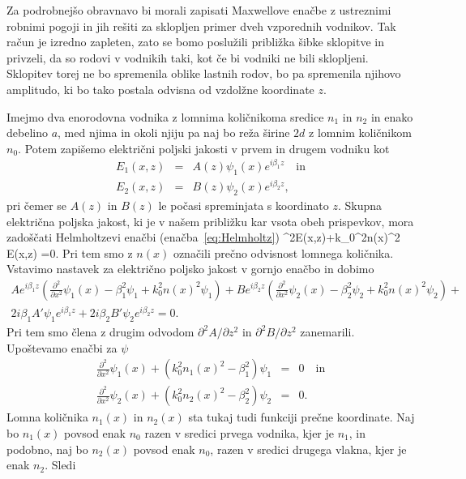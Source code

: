 Za podrobnejšo obravnavo bi morali zapisati Maxwellove enačbe z ustreznimi robnimi pogoji 
in jih rešiti za sklopljen primer dveh vzporednih vodnikov. Tak račun je izredno zapleten, 
zato se bomo poslužili približka šibke sklopitve in privzeli, da so rodovi v vodnikih taki, 
kot če bi vodniki ne bili sklopljeni.
Sklopitev torej ne bo spremenila oblike lastnih rodov, bo pa spremenila njihovo amplitudo, ki 
bo tako postala odvisna od vzdolžne koordinate $z$.

Imejmo dva enorodovna vodnika z lomnima količnikoma sredice $n_1$ in $n_2$ in enako 
debelino $a$, med njima in okoli njiju pa naj bo reža širine $2d$ z lomnim količnikom $n_0$. 
Potem zapišemo električni poljski jakosti v prvem in drugem vodniku kot
\begin{eqnarray}
E_1(x,z) &=& A(z) \psi_1(x) e^{i \beta_1 z} \quad \mathrm{in}\\
E_2(x,z) &=& B(z) \psi_2(x) e^{i \beta_2 z},
\label{eq:10_ampl}
\end{eqnarray}
pri čemer se $A(z)$ in $B(z)$ le počasi spreminjata s koordinato $z$. Skupna električna poljska
jakost, ki je v našem približku kar vsota obeh prispevkov, mora zadoščati Helmholtzevi enačbi
(enačba~\ref{eq:Helmholtz})
\beq
\nabla^{2}E(x,z)+k_0^{2}n(x)^2 E(x,z) =0.
\eeq
Pri tem smo z $n(x)$ označili prečno odvisnost lomnega količnika.
Vstavimo nastavek za električno poljsko jakost v gornjo enačbo in dobimo
\begin{multline}
A e^{i \beta_1 z}\left(\frac{\partial^2}{\partial x^2}\psi_1(x) - \beta_1^2\psi_1 + k_0^2
n(x)^2 \psi_1 \right)
+ 
B e^{i \beta_2 z}\left(\frac{\partial^2}{\partial x^2}\psi_2(x) - \beta_2^2\psi_2 + k_0^2
n(x)^2 \psi_2 \right)+ \\2 i \beta_1 A' \psi_1 e^{i \beta_1 z}+
2 i \beta_2 B' \psi_2 e^{i \beta_2 z} = 0.
\end{multline}
Pri tem smo člena z drugim odvodom $\partial^2 A/\partial z^2$ in $\partial^2 B/\partial z^2$
zanemarili. Upoštevamo enačbi za $\psi$
\begin{eqnarray}
\frac{\partial^2}{\partial x^2}\psi_1(x) + \left(k_0^2n_1(x)^2-\beta_1^2\right) \psi_1 &=&0 \quad \mathrm{in} \\
\frac{\partial^2}{\partial x^2}\psi_2(x) + \left(k_0^2n_2(x)^2-\beta_2^2\right) \psi_2 &=&0.
\end{eqnarray}
Lomna količnika $n_1(x)$ in $n_2(x)$ sta tukaj tudi funkciji prečne koordinate. Naj bo $n_1(x)$  
povsod enak $n_0$ razen v sredici prvega vodnika, kjer je $n_1$, in podobno, naj bo 
$n_2(x)$ povsod enak $n_0$, razen v sredici drugega vlakna, kjer je enak $n_2$. Sledi
